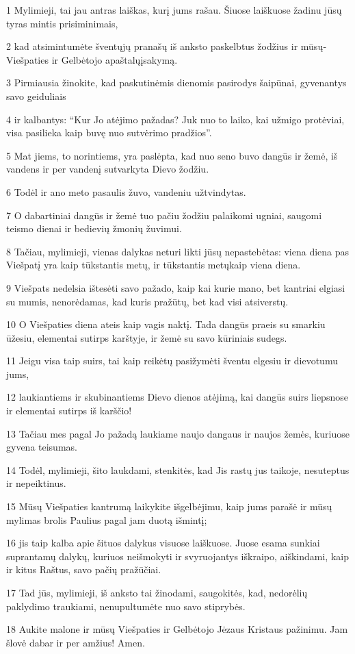 \par 1 Mylimieji, tai jau antras laiškas, kurį jums rašau. Šiuose laiškuose žadinu jūsų tyras mintis prisiminimais, 
\par 2 kad atsimintumėte šventųjų pranašų iš anksto paskelbtus žodžius ir mūsų­Viešpaties ir Gelbėtojo apaštalų­įsakymą. 
\par 3 Pirmiausia žinokite, kad paskutinėmis dienomis pasirodys šaipūnai, gyvenantys savo geiduliais 
\par 4 ir kalbantys: “Kur Jo atėjimo pažadas? Juk nuo to laiko, kai užmigo protėviai, visa pasilieka kaip buvę nuo sutvėrimo pradžios”. 
\par 5 Mat jiems, to norintiems, yra paslėpta, kad nuo seno buvo dangūs ir žemė, iš vandens ir per vandenį sutvarkyta Dievo žodžiu. 
\par 6 Todėl ir ano meto pasaulis žuvo, vandeniu užtvindytas. 
\par 7 O dabartiniai dangūs ir žemė tuo pačiu žodžiu palaikomi ugniai, saugomi teismo dienai ir bedievių žmonių žuvimui. 
\par 8 Tačiau, mylimieji, vienas dalykas neturi likti jūsų nepastebėtas: viena diena pas Viešpatį yra kaip tūkstantis metų, ir tūkstantis metų­kaip viena diena. 
\par 9 Viešpats nedelsia ištesėti savo pažado, kaip kai kurie mano, bet kantriai elgiasi su mumis, nenorėdamas, kad kuris pražūtų, bet kad visi atsiverstų. 
\par 10 O Viešpaties diena ateis kaip vagis naktį. Tada dangūs praeis su smarkiu ūžesiu, elementai sutirps karštyje, ir žemė su savo kūriniais sudegs. 
\par 11 Jeigu visa taip suirs, tai kaip reikėtų pasižymėti šventu elgesiu ir dievotumu jums, 
\par 12 laukiantiems ir skubinantiems Dievo dienos atėjimą, kai dangūs suirs liepsnose ir elementai sutirps iš karščio! 
\par 13 Tačiau mes pagal Jo pažadą laukiame naujo dangaus ir naujos žemės, kuriuose gyvena teisumas. 
\par 14 Todėl, mylimieji, šito laukdami, stenkitės, kad Jis rastų jus taikoje, nesuteptus ir nepeiktinus. 
\par 15 Mūsų Viešpaties kantrumą laikykite išgelbėjimu, kaip jums parašė ir mūsų mylimas brolis Paulius pagal jam duotą išmintį; 
\par 16 jis taip kalba apie šituos dalykus visuose laiškuose. Juose esama sunkiai suprantamų dalykų, kuriuos neišmokyti ir svyruojantys iškraipo, aiškindami, kaip ir kitus Raštus, savo pačių pražūčiai. 
\par 17 Tad jūs, mylimieji, iš anksto tai žinodami, saugokitės, kad, nedorėlių paklydimo traukiami, nenupultumėte nuo savo stiprybės. 
\par 18 Aukite malone ir mūsų Viešpaties ir Gelbėtojo Jėzaus Kristaus pažinimu. Jam šlovė dabar ir per amžius! Amen.



